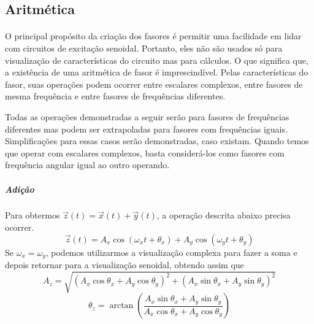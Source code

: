 \documentclass[conference,harvard, brazil]{sbatex}
\begin{document}
	\subsection{Aritmética}
	\label{sec:arit}
	\paragraph{}O principal propósito da criação dos fasores é permitir uma facilidade em lidar com circuitos de excitação senoidal. Portanto, eles não são usados só para visualização de características do circuito mas para cálculos. O que significa que, a existência de uma aritmética de fasor é imprescindível. Pelas características do fasor, suas operações podem ocorrer entre escalares complexos, entre fasores de mesma frequência e entre fasores de frequências diferentes.
	
	Todas as operações demonstradas a seguir serão para fasores de frequências diferentes mas podem ser extrapoladas para fasores com frequências iguais. Simplificações para essas casos serão demonstradas, caso existam. Quando temos que operar com escalares complexos, basta considerá-los como fasores com frequência angular igual ao outro operando.
	
	\subparagraph{Adição}Para obtermos $\overrightarrow{z}(t) = \overrightarrow{x}(t)+\overrightarrow{y}(t)$, a operação descrita abaixo precisa ocorrer.
	\begin{equation*}
		\overrightarrow{z}(t) = A_x\cos(\omega_xt+\theta_x) + A_y\cos(\omega_yt+\theta_y)
	\end{equation*}
	Se $\omega_x=\omega_y$, podemos utilizarmos a visualização complexa para fazer a soma e depois retornar para a visualização senoidal, obtendo assim que
	\begin{equation*}
		A_z=\sqrt{(A_x\cos\theta_x+A_y\cos\theta_y)^2+(A_x\sin\theta_x+A_y\sin\theta_y)^2}
	\end{equation*}
	\begin{equation}
		\theta_z=\arctan\left(\dfrac{A_x\sin\theta_x+A_y\sin\theta_y}{A_x\cos\theta_x+A_y\cos\theta_y}\right)
		\label{eq:add}
	\end{equation}
	
\end{document}
